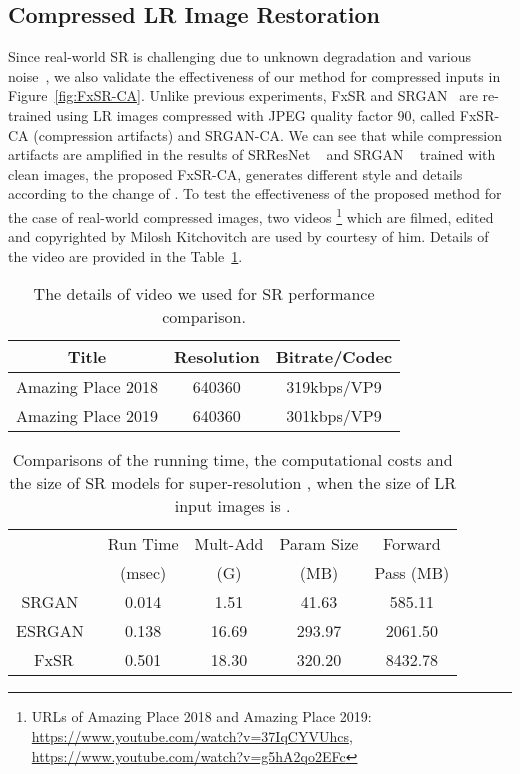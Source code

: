 \documentclass{article}
\begin{document}
\subsection{Compressed LR Image Restoration}
Since real-world SR is challenging due to unknown degradation and various noise~\cite{zhang2020ntire, lugmayr2020ntire, nah2019ntire, hussein2020correction, ahn2020simusr, fritsche2019frequency, zhang2018learning, lugmayr2019unsupervised}, we also validate the effectiveness of our method for compressed inputs in Figure~\ref{fig:FxSR-CA}. Unlike previous experiments, FxSR and SRGAN~\cite{2017photo} are re-trained using LR images compressed with JPEG quality factor 90, called FxSR-CA (compression artifacts) and SRGAN-CA. We can see that while compression artifacts are amplified in the results of SRResNet ~\cite{2017photo} and SRGAN ~\cite{2017photo} trained with clean images, the proposed FxSR-CA, generates different style and details according to the change of . To test the effectiveness of the proposed method for the case of real-world compressed images, two videos \footnote{URLs of Amazing Place 2018 and Amazing Place 2019: \url{https://www.youtube.com/watch?v=37IqCYVUhcs}, \url{https://www.youtube.com/watch?v=g5hA2qo2EFc}} which are filmed, edited and copyrighted by Milosh Kitchovitch are used by courtesy of him. Details of the video are provided in the Table~\ref{tab:comp_video}.



\begin{table}[ht]
\caption{The details of video we used for SR performance comparison.}
\begin{center}
\small
\begin{tabular}{|c|c|c|}
\hline
Title & Resolution & Bitrate/Codec \\
\hline\hline
Amazing Place 2018    & 640360	&  319kbps/VP9 \\ 
\hline
Amazing Place 2019    & 640360	&  301kbps/VP9 \\ 
\hline
\end{tabular}
\end{center}
\label{tab:comp_video}
\end{table}

\begin{table}[ht]
\caption{Comparisons of the running time, the computational costs and the size of SR models for super-resolution , when the size of LR input images is .}
\begin{center}
\begin{tabular}{|c||c|c|c|c|}
\hline
{}  & Run Time  & Mult-Add & Param Size &  Forward \\
{}  & (msec)  &  (G) & (MB) &  Pass (MB)\\
\hline
\hline
{SRGAN~\cite{2017photo}} & 0.014 & 1.51 & 41.63 & 585.11\\
{ESRGAN~\cite{2018esrgan}} & 0.138 & 16.69 & 293.97 & 2061.50\\
{FxSR} & 0.501 & 18.30 & 320.20 & 8432.78\\
\hline
\end{tabular}
\end{center}
\label{tab:tab_time_space}
\end{table}
\end{document}
